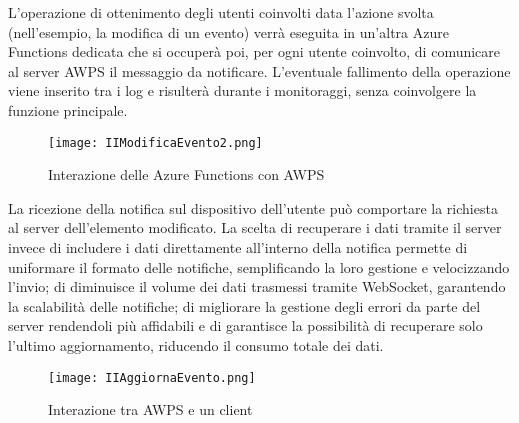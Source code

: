 L’operazione di ottenimento degli utenti coinvolti data l’azione svolta (nell’esempio, la modifica di un evento) verrà eseguita in un’altra Azure Functions dedicata che si occuperà poi, per ogni utente coinvolto, di comunicare  al server AWPS il messaggio da notificare. L’eventuale fallimento della operazione viene inserito tra i log e risulterà durante i monitoraggi, senza coinvolgere la funzione principale.

		
\begin{figure}[h!]
    \centering
    \texttt{[image: IIModificaEvento2.png]}
    \caption{Interazione delle Azure Functions con AWPS}
\end{figure}	

La ricezione della notifica sul dispositivo dell’utente può comportare la richiesta al server dell’elemento modificato. 
La scelta di recuperare i dati tramite il server invece di includere i dati direttamente all’interno della notifica permette di uniformare il formato delle notifiche, 
semplificando la loro gestione e velocizzando l'invio; 
di diminuisce il volume dei dati trasmessi tramite WebSocket, 
garantendo la scalabilità delle notifiche; 
di migliorare la gestione degli errori da parte del server rendendoli più affidabili e 
di garantisce la possibilità di recuperare solo l’ultimo aggiornamento, 
riducendo il consumo totale dei dati.


\begin{figure}[h!]
    \centering
    \texttt{[image: IIAggiornaEvento.png]}
    \caption{Interazione tra AWPS e un client}
\end{figure}	

\clearpage